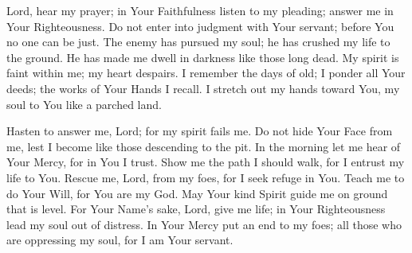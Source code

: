 Lord, hear my prayer;
in Your Faithfulness listen to my pleading;
answer me in Your Righteousness.
Do not enter into judgment with Your servant;
before You no one can be just.
The enemy has pursued my soul;
he has crushed my life to the ground.
He has made me dwell in darkness like those long dead.
My spirit is faint within me;
my heart despairs.
I remember the days of old;
I ponder all Your deeds;
the works of Your Hands I recall.
I stretch out my hands toward You, my soul to You like a parched land.

Hasten to answer me, Lord;
for my spirit fails me.
Do not hide Your Face from me,
lest I become like those descending to the pit.
In the morning let me hear of Your Mercy, for in You I trust.
Show me the path I should walk, for I entrust my life to You.
Rescue me, Lord, from my foes, for I seek refuge in You.
Teach me to do Your Will, for You are my God.
May Your kind Spirit guide me on ground that is level.
For Your Name's sake, Lord, give me life;
in Your Righteousness lead my soul out of distress.
In Your Mercy put an end to my foes;
all those who are oppressing my soul, for I am Your servant.


\newpage